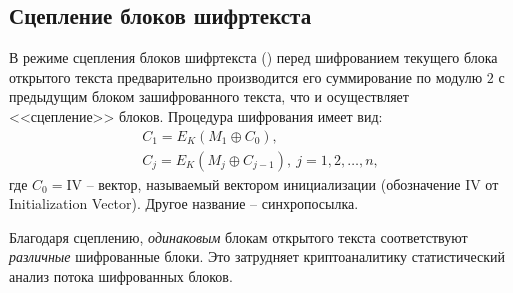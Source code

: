 


\subsection{Сцепление блоков шифртекста}

В режиме сцепления блоков шифртекста () перед шифрованием текущего блока открытого текста предварительно производится его суммирование по модулю $2$ с предыдущим блоком зашифрованного текста, что и осуществляет <<сцепление>> блоков. Процедура шифрования имеет вид:
\[ \begin{array}{l}
    C_1 = E_K(M_1 \oplus C_0), \\
    C_j = E_K(M_j \oplus C_{j-1}), ~ j = 1, 2, \dots, n,
\end{array} \]
где $C_0 = \textrm{IV}$ -- вектор, называемый вектором инициализации (обозначение $\textrm{IV}$ от Initialization Vector). Другое название -- синхропосылка.

Благодаря сцеплению, \emph{одинаковым} блокам открытого текста соответствуют \emph{различные} шифрованные блоки. Это затрудняет криптоаналитику статистический анализ потока шифрованных блоков.

